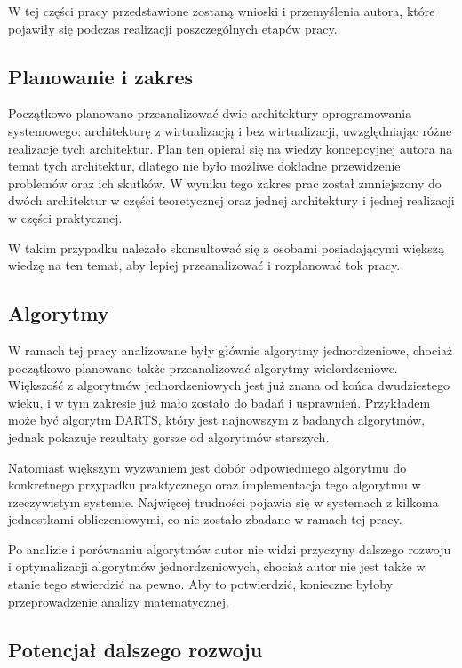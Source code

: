 \documentclass[../main]{subfiles}
\begin{document}
W tej części pracy przedstawione zostaną wnioski i przemyślenia autora, które pojawiły się podczas realizacji poszczególnych etapów pracy.

\subsection*{Planowanie i zakres}

Początkowo planowano przeanalizować dwie architektury oprogramowania systemowego: architekturę z wirtualizacją i bez wirtualizacji, uwzględniając różne realizacje tych architektur. Plan ten opierał się na wiedzy koncepcyjnej autora na temat tych architektur, dlatego nie było możliwe dokładne przewidzenie problemów oraz ich skutków. W wyniku tego zakres prac został zmniejszony do dwóch architektur w części teoretycznej oraz jednej architektury i jednej realizacji w części praktycznej.

W takim przypadku należało skonsultować się z osobami posiadającymi większą wiedzę na ten temat, aby lepiej przeanalizować i rozplanować tok pracy.

\subsection*{Algorytmy}

W ramach tej pracy analizowane były głównie algorytmy jednordzeniowe, chociaż początkowo planowano także przeanalizować algorytmy wielordzeniowe. Większość z algorytmów jednordzeniowych jest już znana od końca dwudziestego wieku, i w tym zakresie już mało zostało do badań i usprawnień. Przykładem może być algorytm DARTS, który jest najnowszym z badanych algorytmów, jednak pokazuje rezultaty gorsze od algorytmów starszych.

Natomiast większym wyzwaniem jest dobór odpowiedniego algorytmu do konkretnego przypadku praktycznego oraz implementacja tego algorytmu w rzeczywistym systemie. Najwięcej trudności pojawia się w systemach z kilkoma jednostkami obliczeniowymi, co nie zostało zbadane w ramach tej pracy.

Po analizie i porównaniu algorytmów autor nie widzi przyczyny dalszego rozwoju i optymalizacji algorytmów jednordzeniowych, chociaż autor nie jest także w stanie tego stwierdzić na pewno. Aby to potwierdzić, konieczne byłoby  przeprowadzenie analizy matematycznej.

\subsection*{Potencjał dalszego rozwoju}
\end{document}
